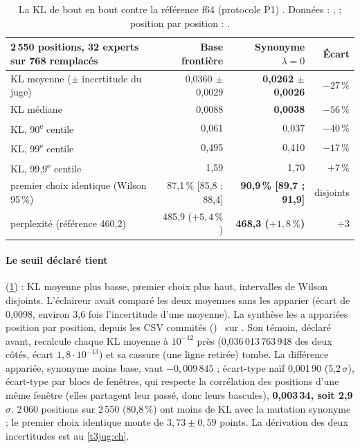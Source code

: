 \begin{table}[tbp]
\centering\small
\begin{tabular}{l r r r}
\toprule
2\,550 positions, 32 experts sur 768 remplacés & Base frontière & \textbf{Synonyme $\lambda = 0$} & Écart \\
\midrule
KL moyenne ($\pm$ incertitude du juge) & 0,0360 $\pm$ 0,0029 & \textbf{0,0262 $\pm$ 0,0026} & $-27\,\%$ \\
KL médiane & 0,0088 & \textbf{0,0038} & $-56\,\%$ \\
KL, 90\textsuperscript{e} centile & 0,061 & 0,037 & $-40\,\%$ \\
KL, 99\textsuperscript{e} centile & 0,495 & 0,410 & $-17\,\%$ \\
KL, 99,9\textsuperscript{e} centile & 1,59 & 1,70 & $+7\,\%$ \\
premier choix identique (Wilson 95\,\%) & 87,1\,\% [85,8 ; 88,4] & \textbf{90,9\,\% [89,7 ; 91,9]} & disjoints \\
perplexité (référence 460,2) & 485,9 ($+5{,}4\,\%$) & \textbf{468,3 ($+1{,}8\,\%$)} & $\div 3$ \\
\bottomrule
\end{tabular}
\caption[La KL de bout en bout, base contre mutation synonyme]{La KL de bout en bout contre la référence f64 (protocole P1) \mes. Données : ,  ; position par position : .}
\label{t3ecl:tab:kl}
\end{table}

\paragraph{Le seuil déclaré tient} (\cref{t3ecl:tab:kl}) : KL moyenne plus basse, premier choix plus haut, intervalles de Wilson disjoints. L'éclaireur avait comparé les deux moyennes sans les apparier (écart de 0,0098, environ 3,6 fois l'incertitude d'une moyenne). La synthèse les a appariées position par position, depuis les CSV commités () \calc~sur \mes. Son témoin, déclaré avant, recalcule chaque KL moyenne à $10^{-12}$ près (0,036\,013\,763\,948 des deux côtés, écart $1{,}8\cdot10^{-13}$) et sa cassure (une ligne retirée) tombe. La différence appariée, synonyme moins base, vaut \textbf{$-0{,}009\,845$} ; écart-type naïf 0,001\,90 (5,2\,$\sigma$), écart-type par blocs de fenêtres, qui respecte la corrélation des positions d'une même fenêtre (elles partagent leur passé, donc leurs bascules), \textbf{0,003\,34, soit 2,9\,$\sigma$}. 2\,060 positions sur 2\,550 (80,8\,\%) ont moins de KL avec la mutation synonyme ; le premier choix identique monte de $3{,}73 \pm 0{,}59$ points. La dérivation des deux incertitudes est au \cref{t3jug:ch}.

